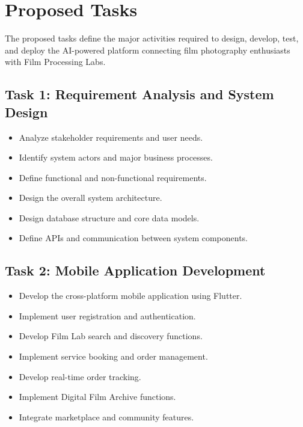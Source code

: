 
\section{Proposed Tasks}

The proposed tasks define the major activities required to design, develop, test, and deploy the AI-powered platform connecting film photography enthusiasts with Film Processing Labs.

\subsection{Task 1: Requirement Analysis and System Design}

\begin{itemize}
    \item Analyze stakeholder requirements and user needs.
    \item Identify system actors and major business processes.
    \item Define functional and non-functional requirements.
    \item Design the overall system architecture.
    \item Design database structure and core data models.
    \item Define APIs and communication between system components.
\end{itemize}

\subsection{Task 2: Mobile Application Development}

\begin{itemize}
    \item Develop the cross-platform mobile application using Flutter.
    \item Implement user registration and authentication.
    \item Develop Film Lab search and discovery functions.
    \item Implement service booking and order management.
    \item Develop real-time order tracking.
    \item Implement Digital Film Archive functions.
    \item Integrate marketplace and community features.
\end{itemize}

